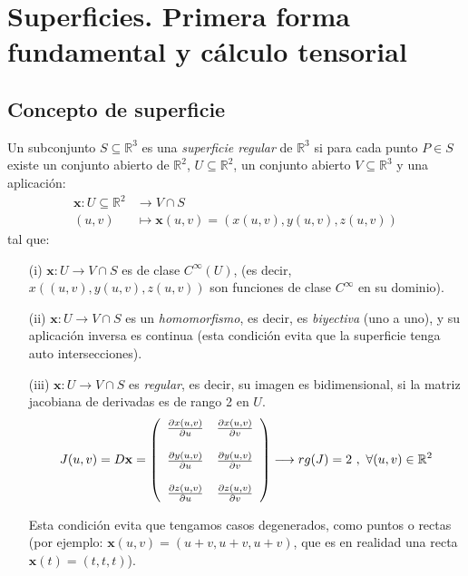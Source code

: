\chapter{Superficies. Primera forma fundamental y cálculo tensorial}

\section{Concepto de superficie}
\large 

Un subconjunto $S\subseteq \mathbb{R}^3$ es una \emph{superficie regular} de $\mathbb{R}^3$ si para cada punto $P\in S$ existe un conjunto abierto de $\mathbb{R}^2$, $U\subseteq \mathbb{R}^2$, un conjunto abierto $V\subseteq \mathbb{R}^3$ y una aplicación:
\begin{align*}
    \mathbf{x}:U\subseteq \mathbb{R}^2 &\longrightarrow V \cap S\\
    (u,v)& \longmapsto \mathbf{x}(u,v)=(x(u,v),y(u,v),z(u,v))
\end{align*}
tal que:
\begin{enumerate}
    \item[(i)] $\mathbf{x}:U\rightarrow V\cap S$ es de clase $C^\infty (U)$, (es decir, $x((u,v), y(u,v), z(u,v))$ son funciones de clase $C^\infty $ en su dominio).

    \item[(ii)] $\mathbf{x}:U\rightarrow V\cap S$ es un \emph{homomorfismo}, es decir, es \emph{biyectiva} (uno a uno), y su aplicación inversa es continua (esta condición evita que la superficie tenga auto intersecciones). 

    \item[(iii)] $\mathbf{x}:U\rightarrow V\cap S$ es \emph{regular}, es decir, su imagen es bidimensional, si la matriz jacobiana de derivadas es de rango 2 en $U$.
    $$
    J(u,v)=D\mathbf{x}=\left ( 
    \begin{array}{cc}
         \pdv{x(u,v)}{u}&\pdv{x(u,v)}{v}  \\\\
         \pdv{y(u,v)}{u}&\pdv{y(u,v)}{v}  \\\\
         \pdv{z(u,v)}{u}&\pdv{z(u,v)}{v}
    \end{array}
    \right )\longrightarrow rg(J)=2 \ , \ \forall (u,v)\in \mathbb{R}^2
    $$

    Esta condición evita que tengamos casos degenerados, como puntos o rectas (por ejemplo: $\mathbf{x}(u,v)=(u+v,u+v,u+v)$, que es en realidad una recta $\mathbf{x}(t)=(t,t,t)$).
\end{enumerate}

